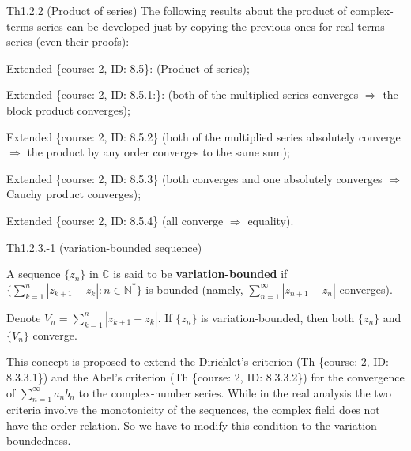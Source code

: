 \documentclass{article}
\begin{document}
\begin{Th}{Th1.2.2 (Product of series)}
    The following results about the product of complex-terms series can be developed just by copying the previous ones for real-terms series (even their proofs):
    \begin{compactenum}
        \item \textcolor{Df}{Extended \{course: 2, ID: 8.5\}: (Product of series)};
        \item Extended \{course: 2, ID: 8.5.1:\}: (both of the multiplied series converges $\Rightarrow$ the block product converges);
        \item Extended \{course: 2, ID: 8.5.2\} (both of the multiplied series absolutely converge $\Rightarrow$ the product by any order converges to the same sum);
        \item Extended \{course: 2, ID: 8.5.3\} (both converges and one absolutely converges $\Rightarrow$ Cauchy product converges);
        \item Extended \{course: 2, ID: 8.5.4\} (all converge $\Rightarrow$ equality).
    \end{compactenum}
\end{Th}

\begin{Df}{Th1.2.3.-1 (variation-bounded sequence)}
    \begin{compactenum}
        \item A sequence $\{z_n\}$ in $\mathbb{C}$ is said to be \textbf{variation-bounded} if $\{\sum_{k=1}^{n} |z_{k+1}-z_k|: n\in\mathbb{N}^\ast\}$ is bounded (namely, $\sum_{n=1}^{\infty} |z_{n+1}-z_n|$ converges).
        \item \textcolor{Th}{Denote $V_n = \sum_{k=1}^{n} |z_{k+1}-z_k|$. If $\{z_n\}$ is variation-bounded, then both $\{z_n\}$ and $\{V_n\}$ converge.}
    \end{compactenum}
\end{Df}

\begin{Rmk}
    This concept is proposed to extend the Dirichlet's criterion (Th \{course: 2, ID: 8.3.3.1\}) and the Abel's criterion (Th \{course: 2, ID: 8.3.3.2\}) for the convergence of $\sum_{n=1}^{\infty} a_nb_n$ to the complex-number series. While in the real analysis the two criteria involve the monotonicity of the sequences, the complex field does not have the order relation. So we have to modify this condition to the variation-boundedness.
\end{Rmk}
\end{document}
